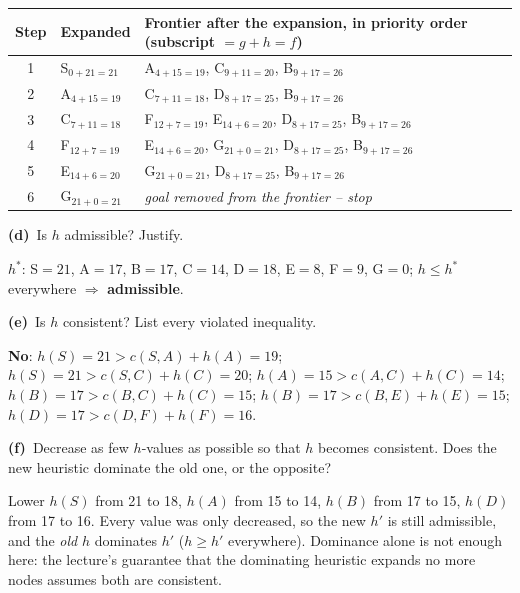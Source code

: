 \documentclass[11pt,a4paper]{article}
\newcommand{\subq}[1]{\par\smallskip\noindent\textbf{#1}\ }
\begin{document}
\begin{solbox}
\begin{center}
\begin{tabularx}{\linewidth}{c l >{\raggedright\arraybackslash}X}
Step & Expanded & Frontier after the expansion, in priority order (subscript $=g+h=f$) \\ \midrule
1 & S$_{0+21=21}$ & A$_{4+15=19}$, C$_{9+11=20}$, B$_{9+17=26}$ \\
2 & A$_{4+15=19}$ & C$_{7+11=18}$, D$_{8+17=25}$, B$_{9+17=26}$ \\
3 & C$_{7+11=18}$ & F$_{12+7=19}$, E$_{14+6=20}$, D$_{8+17=25}$, B$_{9+17=26}$ \\
4 & F$_{12+7=19}$ & E$_{14+6=20}$, G$_{21+0=21}$, D$_{8+17=25}$, B$_{9+17=26}$ \\
5 & E$_{14+6=20}$ & G$_{21+0=21}$, D$_{8+17=25}$, B$_{9+17=26}$ \\
6 & G$_{21+0=21}$ & \textit{goal removed from the frontier -- stop} \\
\bottomrule\end{tabularx}\end{center}
\end{solbox}
\subq{(d)}Is $h$ admissible? Justify.
\begin{solbox}
$h^*$: S$=21$, A$=17$, B$=17$, C$=14$, D$=18$, E$=8$, F$=9$, G$=0$; $h\le h^*$ everywhere $\Rightarrow$ \textbf{admissible}.
\end{solbox}
\subq{(e)}Is $h$ consistent? List every violated inequality.
\begin{solbox}
\textbf{No}: $h(S)=21>c(S,A)+h(A)=19$; $h(S)=21>c(S,C)+h(C)=20$; $h(A)=15>c(A,C)+h(C)=14$; $h(B)=17>c(B,C)+h(C)=15$; $h(B)=17>c(B,E)+h(E)=15$; $h(D)=17>c(D,F)+h(F)=16$.
\end{solbox}
\subq{(f)}Decrease as few $h$-values as possible so that $h$ becomes consistent. Does the new heuristic dominate the old one, or the opposite?
\begin{solbox}
Lower $h(S)$ from 21 to 18, $h(A)$ from 15 to 14, $h(B)$ from 17 to 15, $h(D)$ from 17 to 16. Every value was only decreased, so the new $h'$ is still admissible, and the \emph{old} $h$ dominates $h'$ ($h\ge h'$ everywhere). Dominance alone is not enough here: the lecture's guarantee that the dominating heuristic expands no more nodes assumes both are consistent.
\end{solbox}
\end{document}
